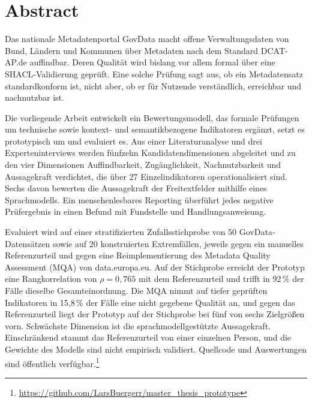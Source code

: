 \clearpage
\thispagestyle{plain}

\chapter*{Abstract}

\noindent
Das nationale Metadatenportal GovData macht offene Verwaltungsdaten von Bund, Ländern
und Kommunen über Metadaten nach dem Standard DCAT-AP.de auffindbar. Deren Qualität
wird bislang vor allem formal über eine SHACL-Validierung geprüft. Eine solche Prüfung
sagt aus, ob ein Metadatensatz standardkonform ist, nicht aber, ob er für Nutzende
verständlich, erreichbar und nachnutzbar ist.

Die vorliegende Arbeit entwickelt ein Bewertungsmodell, das formale Prüfungen um
technische sowie kontext- und semantikbezogene Indikatoren ergänzt, setzt es
prototypisch um und evaluiert es. Aus einer Literaturanalyse und drei
Experteninterviews werden fünfzehn Kandidatendimensionen abgeleitet und zu den vier
Dimensionen Auffindbarkeit, Zugänglichkeit, Nachnutzbarkeit und Aussagekraft
verdichtet, die über 27 Einzelindikatoren operationalisiert sind. Sechs davon bewerten
die Aussagekraft der Freitextfelder mithilfe eines Sprachmodells. Ein menschenlesbares
Reporting überführt jedes negative Prüfergebnis in einen Befund mit Fundstelle und
Handlungsanweisung.

Evaluiert wird auf einer stratifizierten Zufallsstichprobe von 50 GovData-Datensätzen
sowie auf 20 konstruierten Extremfällen, jeweils gegen ein manuelles Referenzurteil
und gegen eine Reimplementierung des Metadata Quality Assessment (MQA) von
data.europa.eu. Auf der Stichprobe erreicht der Prototyp eine Rangkorrelation von
$\rho = 0{,}765$ mit dem Referenzurteil und trifft in 92\,\% der Fälle dieselbe
Gesamteinordnung. Die MQA nimmt auf tiefer geprüften Indikatoren in 15,8\,\% der Fälle
eine nicht gegebene Qualität an, und gegen das Referenzurteil liegt der Prototyp auf
der Stichprobe bei fünf von sechs Zielgrößen vorn. Schwächste Dimension ist die
sprachmodellgestützte Aussagekraft. Einschränkend stammt das Referenzurteil von einer
einzelnen Person, und die Gewichte des Modells sind nicht empirisch validiert.
Quellcode und Auswertungen sind öffentlich verfügbar.\footnote{\url{https://github.com/LarsBuergerr/master_thesis_prototype}}

\pagebreak